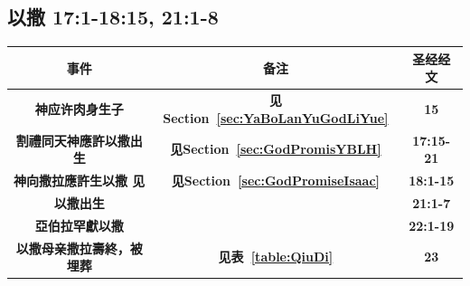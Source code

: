 \subsection{以撒 17:1-18:15, 21:1-8 }
\begin{table}[!hbp]
\begin{threeparttable}
\begin{tabular}{c c c}
\toprule
 \multicolumn{1}{L{\dimexpr0.5\linewidth-1\tabcolsep\relax}}{\bfseries 事件} 
&\multicolumn{1}{L{\dimexpr0.2\linewidth-1\tabcolsep\relax}}{\bfseries  备注}   
&\multicolumn{1}{L{\dimexpr0.1\linewidth-1\tabcolsep\relax}}{\bfseries 圣经经文} \\\hline

\multicolumn{1}{L{\dimexpr0.5\linewidth-1\tabcolsep\relax}}{\bfseries 神应许肉身生子}  
& \multicolumn{1}{L{\dimexpr0.2\linewidth-1\tabcolsep\relax}}{\bfseries 见Section~\ref{sec:YaBoLanYuGodLiYue}}
& \multicolumn{1}{L{\dimexpr0.1\linewidth-1\tabcolsep\relax}}{\bfseries 15}\\ 

\multicolumn{1}{L{\dimexpr0.5\linewidth-1\tabcolsep\relax}}{\bfseries 割禮同天神應許以撒出生}  
& \multicolumn{1}{L{\dimexpr0.2\linewidth-1\tabcolsep\relax}}{\bfseries 见Section~\ref{sec:GodPromisYBLH}}
& \multicolumn{1}{L{\dimexpr0.1\linewidth-1\tabcolsep\relax}}{\bfseries  17:15-21 }\\ 

\multicolumn{1}{L{\dimexpr0.5\linewidth-1\tabcolsep\relax}}{\bfseries 神向撒拉應許生以撒  见}  
& \multicolumn{1}{L{\dimexpr0.2\linewidth-1\tabcolsep\relax}}{\bfseries 见Section~\ref{sec:GodPromiseIsaac}}
& \multicolumn{1}{L{\dimexpr0.1\linewidth-1\tabcolsep\relax}}{\bfseries 18:1-15}\\ 

\multicolumn{1}{L{\dimexpr0.5\linewidth-1\tabcolsep\relax}}{\bfseries 以撒出生 }  
& \multicolumn{1}{L{\dimexpr0.2\linewidth-1\tabcolsep\relax}}{\bfseries }
& \multicolumn{1}{L{\dimexpr0.1\linewidth-1\tabcolsep\relax}}{\bfseries 21:1-7}\\ 

\multicolumn{1}{L{\dimexpr0.5\linewidth-1\tabcolsep\relax}}{\bfseries 亞伯拉罕獻以撒 }  
& \multicolumn{1}{L{\dimexpr0.2\linewidth-1\tabcolsep\relax}}{\bfseries }
& \multicolumn{1}{L{\dimexpr0.1\linewidth-1\tabcolsep\relax}}{\bfseries 22:1-19}\\ 

\multicolumn{1}{L{\dimexpr0.5\linewidth-1\tabcolsep\relax}}{\bfseries 以撒母亲撒拉壽終，被埋葬}  
& \multicolumn{1}{L{\dimexpr0.2\linewidth-1\tabcolsep\relax}}{\bfseries 见表~\ref{table:QiuDi}}
& \multicolumn{1}{L{\dimexpr0.1\linewidth-1\tabcolsep\relax}}{\bfseries 23}\\ 


\end{tabular}
\end{threeparttable}
\end{table}
